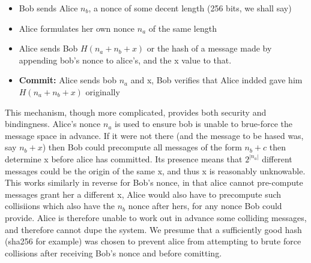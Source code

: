 \documentclass{article}
\begin{document}
\begin{itemize}
	\item Bob sends Alice $n_b$, a nonce of some decent length (256 bits, we shall say)
	\item Alice formulates her own nonce $n_a$ of the same length
	\item Alice sends Bob $H(n_a + n_b + x)$ or the hash of a message made by appending bob's nonce to alice's, and the x value to that.
	\item {\bf Commit:} Alice sends bob $n_a$ and x, Bob verifies that Alice indded gave him $H(n_a + n_b + x)$ originally
\end{itemize}

This mechanism, though more complicated, provides both security and bindingness.
Alice's nonce $n_a$ is used to ensure bob is unable to brue-force the message space in advance.
If it were not there (and the message to be hased was, say $n_b + x$) then Bob could precompute all messages of the form $n_b + c$ then determine x before alice has committed.
Its presence means that $2^{|n_a|}$ different messages could be the origin of the same x, and thus x is reasonably unknowable.
This works similarly in reverse for Bob's nonce, in that alice cannot pre-compute messages grant her a different x, Alice would also have to precompute such collisiions which also have the $n_b$ nonce after hers, for any nonce Bob could provide.
Alice is therefore unable to work out in advance some colliding messages, and therefore cannot dupe the system.
We presume that a sufficiently good hash (sha256 for example) was chosen to prevent alice from attempting to brute force collisions after receiving Bob's nonce and before comitting.
\end{document}
